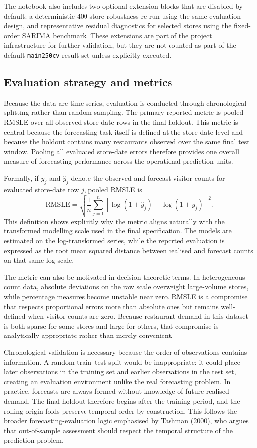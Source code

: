 \documentclass[11pt,oneside]{scrartcl}
\begin{document}
The notebook also includes two optional extension blocks that are disabled by default: a deterministic 400-store robustness re-run using the same evaluation design, and representative residual diagnostics for selected stores using the fixed-order SARIMA benchmark. These extensions are part of the project infrastructure for further validation, but they are not counted as part of the default \texttt{main250cv} result set unless explicitly executed.

\subsection{Evaluation strategy and metrics}
Because the data are time series, evaluation is conducted through chronological splitting rather than random sampling. The primary reported metric is pooled RMSLE over all observed store-date rows in the final holdout. This metric is central because the forecasting task itself is defined at the store-date level and because the holdout contains many restaurants observed over the same final test window. Pooling all evaluated store-date errors therefore provides one overall measure of forecasting performance across the operational prediction units.

Formally, if $y_j$ and $\hat{y}_j$ denote the observed and forecast visitor counts for evaluated store-date row $j$, pooled RMSLE is
\[
\mathrm{RMSLE}
=
\sqrt{
\frac{1}{n}
\sum_{j=1}^{n}
\left[
\log(1+\hat{y}_j)-\log(1+y_j)
\right]^2
}.
\]
This definition shows explicitly why the metric aligns naturally with the transformed modelling scale used in the final specification. The models are estimated on the log-transformed series, while the reported evaluation is expressed as the root mean squared distance between realised and forecast counts on that same log scale.

The metric can also be motivated in decision-theoretic terms. In heterogeneous count data, absolute deviations on the raw scale overweight large-volume stores, while percentage measures become unstable near zero. RMSLE is a compromise that respects proportional errors more than absolute ones but remains well-defined when visitor counts are zero. Because restaurant demand in this dataset is both sparse for some stores and large for others, that compromise is analytically appropriate rather than merely convenient.

Chronological validation is necessary because the order of observations contains information. A random train--test split would be inappropriate: it could place later observations in the training set and earlier observations in the test set, creating an evaluation environment unlike the real forecasting problem. In practice, forecasts are always formed without knowledge of future realised demand. The final holdout therefore begins after the training period, and the rolling-origin folds preserve temporal order by construction. This follows the broader forecasting-evaluation logic emphasised by Tashman (2000), who argues that out-of-sample assessment should respect the temporal structure of the prediction problem.
\end{document}
